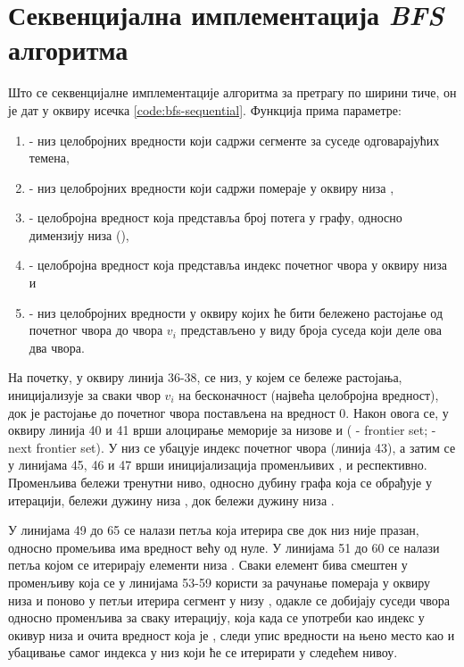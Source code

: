\section{Секвенцијална имплементација \textit{BFS} алгоритма}
Што се секвенцијалне имплементације алгоритма за претрагу по ширини тиче, он је дат у оквиру исечка \ref{code:bfs-sequential}. Функција  прима параметре:
\begin{enumerate}
    \item {} - низ целобројних вредности који садржи сегменте за суседе одговарајућих темена,
    \item {} - низ целобројних вредности који садржи помераје у оквиру низа ,
    \item {} - целобројна вредност која представља број потега у графу, односно димензију низа  (),
    \item {} - целобројна вредност која представља индекс почетног чвора у оквиру низа  и
    \item {} - низ целобројних вредности у оквиру којих ће бити бележено растојање од почетног чвора  до чвора $v_i$ представљено у виду броја суседа који деле ова два чвора.
\end{enumerate}

\par
На почетку, у оквиру линија 36-38, се низ, у којем се бележе растојања, иницијализује за сваки чвор $v_i$ на бесконачност (највећа целобројна вредност), док је растојање до почетног чвора постављена на вредност $0$. Након овога се, у оквиру линија 40 и 41 врши алоцирање меморије за низове  и  ( - frontier set;  - next frontier set). У низ  се убацује индекс почетног чвора  (линија 43), а затим се у линијама 45, 46 и 47 врши иницијализација променљивих ,  и  респективно. Променљива  бележи тренутни ниво, односно дубину графа која се обрађује у итерацији,  бележи дужину низа , док  бележи дужину низа .

\par
У линијама 49 до 65 се налази петља која итерира све док низ  није празан, односно промељива  има вредност већу од нуле. У линијама 51 до 60 се налази петља којом се итерирају елементи низа . Сваки елемент бива смештен у променљиву  која се у линијама 53-59 користи за рачунање помераја у оквиру низа  и поново у петљи итерира сегмент у низу , одакле се добијају суседи чвора  односно променљива  за сваку итерацију, која када се употреби као индекс у окивур низа  и очита вредност која је , следи упис вредности  на њено место као и убацивање самог индекса у низ  који ће се итерирати у следећем нивоу.

